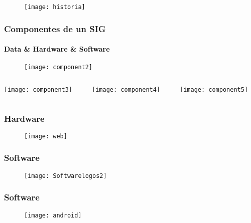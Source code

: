\documentclass[14pt]{beamer}
\begin{document}
\begin{frame}
  \begin{figure}
    \centering
    \texttt{[image: historia]}
  \end{figure}
\end{frame}
\begin{frame}
\frametitle{Componentes de un SIG}
\framesubtitle{Data \& Hardware \& Software}
  \begin{figure}
    \centering
    \texttt{[image: component2]}
   \end{figure}
\begin{columns}
		\begin{column}{.33\linewidth}
		 \texttt{[image: component3]}
		\end{column}
		\begin{column}{.33\linewidth}
			 \texttt{[image: component4]}
		\end{column}
		\begin{column}{.33\linewidth}
			 \texttt{[image: component5]}
		\end{column}
	\end{columns}
\end{frame}
\begin{frame}
\frametitle{Hardware}
  \begin{figure}
    \centering
    \texttt{[image: web]}
  \end{figure}
\end{frame}
\begin{frame}
\frametitle{Software}
  \begin{figure}
    \centering
    \texttt{[image: Softwarelogos2]}
  \end{figure}
\end{frame}
\begin{frame}
\frametitle{Software}
  \begin{figure}
    \centering
    \texttt{[image: android]}
  \end{figure}
\end{frame}
\end{document}
